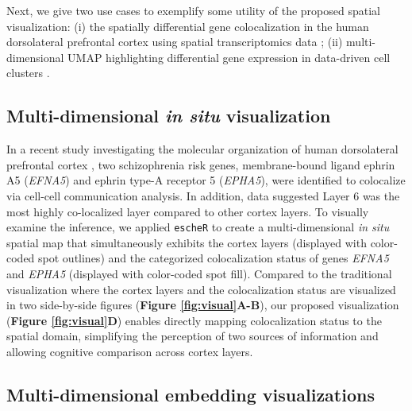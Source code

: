\documentclass[unnumsec,webpdf,modern,large,namedate]{oup-authoring-template}%
\theoremstyle{thmstyleone}%
\theoremstyle{thmstyletwo}%
\theoremstyle{thmstylethree}%
\begin{document}
Next, we give two use cases to exemplify some utility of the proposed spatial visualization: (i) the spatially differential gene colocalization in the human dorsolateral prefrontal cortex using spatial transcriptomics data \citep{huukimyers_2023}; (ii) multi-dimensional UMAP highlighting differential gene expression in data-driven cell clusters \citep{freytag_2020}. 

\subsection{Multi-dimensional \textit{in situ} visualization}
In a recent study investigating the molecular organization of human dorsolateral prefrontal cortex \citep{huukimyers_2023}, two schizophrenia risk genes, membrane-bound ligand ephrin A5 (\textit{EFNA5}) and ephrin type-A receptor 5 (\textit{EPHA5}), were identified to colocalize via cell-cell communication analysis. In addition, data suggested Layer 6 was the most highly co-localized layer compared to other cortex layers. To visually examine the inference, we applied \texttt{escheR} to create a multi-dimensional \textit{in situ} spatial map that simultaneously exhibits the cortex layers (displayed with color-coded spot outlines) and the categorized colocalization status of genes \textit{EFNA5} and \textit{EPHA5} (displayed with color-coded spot fill). Compared to the traditional visualization where the cortex layers and the colocalization status are visualized in two side-by-side figures (\textbf{Figure \ref{fig:visual}A-B}), our proposed visualization (\textbf{Figure \ref{fig:visual}D}) enables directly mapping colocalization status to the spatial domain, simplifying the perception of two sources of information and allowing cognitive comparison across cortex layers. 

\subsection{Multi-dimensional embedding visualizations}
\end{document}

